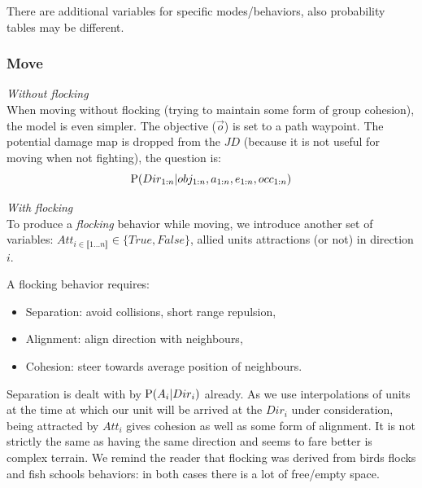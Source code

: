 There are additional variables for specific modes/behaviors, also probability tables may be different.

\subsubsection{Move}

\noindent\textit{Without flocking}\\
When moving without flocking (trying to maintain some form of group cohesion), the model is even simpler. The objective ($\vec{o}$) is set to a path waypoint. The potential damage map is dropped from the $JD$ (because it is not useful for moving when not fighting), the question is:
\begin{equation}
\mathrm{P}(Dir_{1:n} | obj_{1:n}, a_{1:n}, e_{1:n}, occ_{1:n})
\end{equation}

\noindent\textit{With flocking}\\
To produce a \textit{flocking} behavior while moving, we introduce another set of variables: $Att_{i \in \llbracket 1 \dots n\rrbracket} \in \{True,False\}$, allied units attractions (or not) in direction $i$.

A flocking behavior \citep{Reynolds_1999} requires:
\begin{itemize}
    \item Separation: avoid collisions, short range repulsion,
    \item Alignment: align direction with neighbours,
    \item Cohesion: steer towards average position of neighbours.
\end{itemize}
Separation is dealt with by $\mathrm{P}(A_i|Dir_i)$ already. As we use interpolations of units at the time at which our unit will be arrived at the $Dir_i$ under consideration, being attracted by $Att_i$ gives cohesion as well as some form of alignment. It is not strictly the same as having the same direction and seems to fare better is complex terrain. We remind the reader that flocking was derived from birds flocks and fish schools behaviors: in both cases there is a lot of free/empty space.

